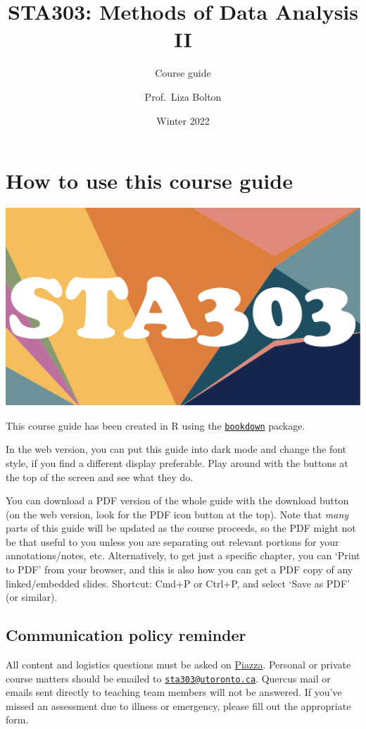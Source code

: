 \documentclass[
  openany]{book}
\title{STA303: Methods of Data Analysis II}
\subtitle{Course guide}
\author{Prof.~Liza Bolton}
\date{Winter 2022}
\begin{document}
\maketitle

{
\hypersetup{linkcolor=}
\setcounter{tocdepth}{1}
\tableofcontents
}
\hypertarget{how-to-use-this-course-guide}{%
\chapter{How to use this course guide}\label{how-to-use-this-course-guide}}

\begin{center}\includegraphics[width=0.5\linewidth]{images/quercus-cover} \end{center}

This course guide has been created in R using the \href{https://bookdown.org/}{\texttt{bookdown}} package.

In the web version, you can put this guide into dark mode and change the font style, if you find a different display preferable. Play around with the buttons at the top of the screen and see what they do.

You can download a PDF version of the whole guide with the download button (on the web version, look for the PDF icon button at the top). Note that \emph{many} parts of this guide will be updated as the course proceeds, so the PDF might not be that useful to you unless you are separating out relevant portions for your annotations/notes, etc. Alternatively, to get just a specific chapter, you can `Print to PDF' from your browser, and this is also how you can get a PDF copy of any linked/embedded slides. Shortcut: Cmd+P or Ctrl+P, and select `Save as PDF' (or similar).

\hypertarget{communication-policy-reminder}{%
\section{Communication policy reminder}\label{communication-policy-reminder}}

All content and logistics questions must be asked on \href{https://piazza.com/class/kx47tj4fmy65dg}{Piazza}. Personal or private course matters should be emailed to \href{mailto:sta303@utoronto.ca}{\nolinkurl{sta303@utoronto.ca}}. Quercus mail or emails sent directly to teaching team members will not be answered. If you've missed an assessment due to illness or emergency, please fill out the appropriate form.
\end{document}

